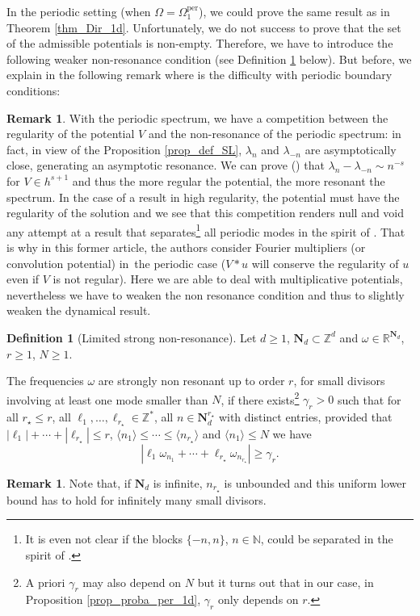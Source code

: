 \documentclass[JEP,XML,SOM,Unicode,NoEqCountersInSection,published]{cedram}
\theoremstyle{definition}
\newtheorem{definition}[theorem]{Definition}
\newtheorem{remark}[theorem]{Remark}
\begin{document}
In the periodic setting (\ie when $\Omega= \Omega_1^{\mathrm{per}}$), we could prove the same result as in Theorem \ref{thm_Dir_1d}. Unfortunately, we do not success to prove that the set of the admissible potentials is non-empty. Therefore, we have to introduce the following weaker non-resonance condition (see Definition \ref{def_SNR_lim} below). But before,
we explain in the following remark where is the difficulty with periodic boundary conditions:
\begin{remark}\label{rk:per}
With the periodic spectrum, we have a competition between the regularity of the potential $V$ and the non-resonance of the periodic spectrum: in fact, in view of the Proposition \ref{prop_def_SL}, $\lambda_n$ and $\lambda_{-n}$ are asymptotically close, generating an asymptotic resonance. We can prove (\cf \cite{Mar86}) that $\lambda_n\!-\!\lambda_{-n}\!\sim\! n^{-s}$ for \hbox{$V\!\in\! h^{s+1}$} and thus the more regular the potential, the more resonant the spectrum. In the case of a result in high regularity, the potential must have the regularity of the solution and we see that this competition renders null and void any attempt at a result that separates\footnote{It is even not clear if the blocks $\{-n,n\}$, $n\in \mathbb{N}$, could be separated in the spirit of \cite{BDGS07}.} all periodic modes in the spirit of \cite{BG06}. That is why in this former article, the authors consider Fourier multipliers (or convolution potential) in~the peri\-odic case ($V*u$ will conserve the regularity of $u$ even if $V$ is not regular). Here we are able to deal with multiplicative potentials, nevertheless we have to weaken the non resonance condition and thus to slightly weaken the dynamical result.
\end{remark}
\begin{definition}[Limited strong non-resonance] \label{def_SNR_lim} Let $d\!\geq\! 1$, $\mathbf{N}_d \!\subset\! \mathbb{Z}^d$ and $\omega \!\in\! \mathbb{R}^{\mathbf{N}_d}$, $r\geq 1$, $N \geq 1$.

The frequencies $\omega$ are strongly non resonant up to order $r$, for small divisors involving at least one mode smaller than $N$, if there exists\footnote{A priori $\gamma_r$ may also depend on $N$ but it turns out that in our case, \ie in Proposition \ref{prop_proba_per_1d}, $\gamma_r$ only depends on $r$.} $\gamma_r>0$ such that for all $r_\star \leq r$, all $\ell_1,\dots,\ell_{r_\star} \in \mathbb{Z}^*$, all $n\in \mathbf{N}_d^{r_\star}$ with distinct entries, provided that $|\ell_1|+\cdots+|\ell_{r_\star}| \leq r$, $\langle n_1 \rangle \leq \cdots \leq \langle n_{r_\star} \rangle$ and $\langle n_1 \rangle\leq N$ we have
\[
|\ell_1 \omega_{n_1} + \cdots + \ell_{r_\star} \omega_{n_{r_\star}} | \geq \gamma_r.
\]
\end{definition}
\begin{remark}
Note that, if $\mathbf{N}_d$ is infinite, $n_{r_\star}$ is unbounded and this uniform lower bound has to hold for infinitely many small divisors.
\end{remark}
\end{document}
